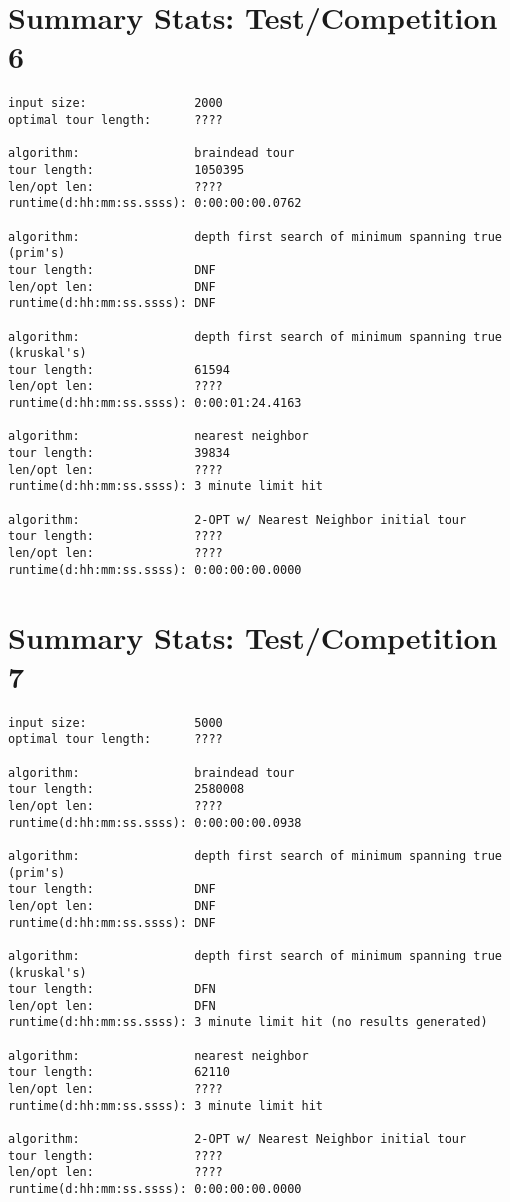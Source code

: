 \documentclass[12pt]{article}
\begin{document}
\newpage
\section*{Summary Stats: Test/Competition 6}
\begin{verbatim}
input size:               2000
optimal tour length:      ????

algorithm:                braindead tour
tour length:              1050395
len/opt len:              ????
runtime(d:hh:mm:ss.ssss): 0:00:00:00.0762

algorithm:                depth first search of minimum spanning true (prim's) 
tour length:              DNF
len/opt len:              DNF
runtime(d:hh:mm:ss.ssss): DNF

algorithm:                depth first search of minimum spanning true (kruskal's) 
tour length:              61594
len/opt len:              ????
runtime(d:hh:mm:ss.ssss): 0:00:01:24.4163

algorithm:                nearest neighbor 
tour length:              39834
len/opt len:              ????
runtime(d:hh:mm:ss.ssss): 3 minute limit hit

algorithm:                2-OPT w/ Nearest Neighbor initial tour
tour length:              ????
len/opt len:              ????
runtime(d:hh:mm:ss.ssss): 0:00:00:00.0000
\end{verbatim}

\newpage
\section*{Summary Stats: Test/Competition 7}
\begin{verbatim}
input size:               5000
optimal tour length:      ????

algorithm:                braindead tour
tour length:              2580008
len/opt len:              ????
runtime(d:hh:mm:ss.ssss): 0:00:00:00.0938

algorithm:                depth first search of minimum spanning true (prim's) 
tour length:              DNF
len/opt len:              DNF
runtime(d:hh:mm:ss.ssss): DNF

algorithm:                depth first search of minimum spanning true (kruskal's) 
tour length:              DFN
len/opt len:              DFN
runtime(d:hh:mm:ss.ssss): 3 minute limit hit (no results generated)

algorithm:                nearest neighbor 
tour length:              62110
len/opt len:              ????
runtime(d:hh:mm:ss.ssss): 3 minute limit hit

algorithm:                2-OPT w/ Nearest Neighbor initial tour
tour length:              ????
len/opt len:              ????
runtime(d:hh:mm:ss.ssss): 0:00:00:00.0000
\end{verbatim}

\newpage
\printbibliography
\end{document}
